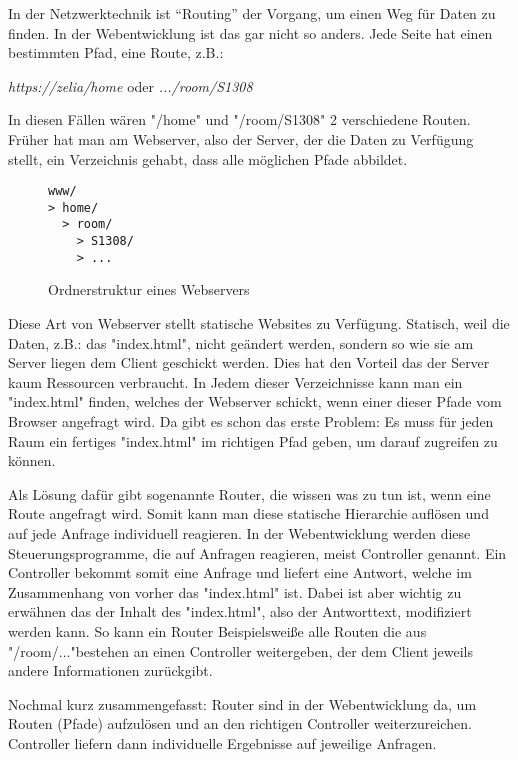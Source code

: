 

In der Netzwerktechnik ist “Routing” der Vorgang, um einen Weg für Daten zu finden. In der Webentwicklung ist das gar nicht so anders. Jede Seite hat einen bestimmten Pfad, eine Route, z.B.:

\emph{https://zelia/home} oder \emph{.../room/S1308}

In diesen Fällen wären "/home" und "/room/S1308" 2 verschiedene Routen. Früher hat man am Webserver, also der Server, der die Daten zu Verfügung stellt, ein Verzeichnis gehabt, dass alle möglichen Pfade abbildet.

\begin{figure}[h]
    \begin{lstlisting}
www/
> home/
  > room/
    > S1308/
    > ...
    \end{lstlisting}
    \caption{Ordnerstruktur eines Webservers}
\end{figure}

Diese Art von Webserver stellt statische Websites zu Verfügung. Statisch, weil die Daten, z.B.: das "index.html", nicht geändert werden, sondern so wie sie am Server liegen dem Client geschickt werden. Dies hat den Vorteil das der Server kaum Ressourcen verbraucht. In Jedem dieser Verzeichnisse kann man ein "index.html" finden, welches der Webserver schickt, wenn einer dieser Pfade vom Browser angefragt wird. Da gibt es schon das erste Problem: Es muss für jeden Raum ein fertiges "index.html" im richtigen Pfad geben, um darauf zugreifen zu können.

Als Lösung dafür gibt sogenannte Router, die wissen was zu tun ist, wenn eine Route angefragt wird. Somit kann man diese statische Hierarchie auflösen und auf jede Anfrage individuell reagieren. In der Webentwicklung werden diese Steuerungsprogramme, die auf Anfragen reagieren, meist Controller genannt. Ein Controller bekommt somit eine Anfrage und liefert eine Antwort, welche im Zusammenhang von vorher das "index.html" ist. Dabei ist aber wichtig zu erwähnen das der Inhalt des "index.html", also der Antworttext, modifiziert werden kann. So kann ein Router Beispielsweiße alle Routen die aus "/room/..."bestehen an einen Controller weitergeben, der dem Client jeweils andere Informationen zurückgibt.

Nochmal kurz zusammengefasst: Router sind in der Webentwicklung da, um Routen (Pfade) aufzulösen und an den richtigen Controller weiterzureichen. Controller liefern dann individuelle Ergebnisse auf jeweilige Anfragen.

